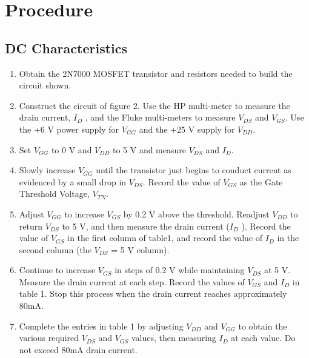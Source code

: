 
\section{Procedure}
\label{sec:procedure}

\subsection{DC Characteristics}
\label{sec:inverter}

\begin{enumerate}
\item Obtain the 2N7000 MOSFET transistor and resistors needed to build the circuit shown.
\item Construct the circuit of figure 2. Use the HP multi-meter to measure the drain current, $I_D$ , and the Fluke multi-meters to measure $V_{DS}$ and $V_{GS}$. Use the +6 V power supply for $V_{GG}$ and the +25 V supply for $V_{DD}$.
\item Set $V_{GG}$ to 0 V and $V_{DD}$ to 5 V and measure $V_{DS}$ and $I_D$.
 \item Slowly increase $V_{GG}$ until the transistor just begins to conduct current as evidenced by a small drop in $V_{DS}$. Record the value of $V_{GS}$ as the Gate Threshold Voltage, $V_{TN}$.
\item Adjust $V_{GG}$ to increase $V_{GS}$ by 0.2 V above the threshold. Readjust $V_{DD}$ to return $V_{DS}$ to 5 V, and then measure the drain current ($I_D$ ). Record the value of $V_{GS}$ in the first column of table1, and record the value of $I_D$ in the second column (the $V_{DS}$ = 5 V column).
\item Continue to increase $V_{GS}$ in steps of 0.2 V while maintaining $V_{DS}$ at 5 V. Measure the drain current at each step. Record the values of $V_{GS}$ and $I_D$ in table 1. Stop this process when the drain current reaches approximately 80mA.
\item Complete the entries in table 1 by adjusting $V_{DD}$ and $V_{GG}$ to obtain the various required $V_{DS}$ and $V_{GS}$ values, then measuring $I_D$ at each value. Do not exceed 80mA drain current.
\end{enumerate}

